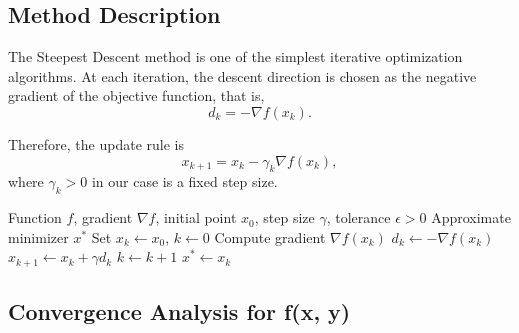 \documentclass[11pt]{article}
\begin{document}
\subsection{Method Description}

The Steepest Descent method is one of the simplest iterative optimization algorithms.
At each iteration, the descent direction is chosen as the negative gradient of the
objective function, that is,
\[
d_k = -\nabla f(x_k).
\]

Therefore, the update rule is
\[
x_{k+1} = x_k - \gamma_k \nabla f(x_k),
\]
where $\gamma_k > 0$ in our case is a fixed step size.

\begin{algorithm}[H]
\caption{Steepest Descent Method}
\begin{algorithmic}[1]
\Require Function $f$, gradient $\nabla f$, initial point $x_0$, step size $\gamma$, tolerance $\epsilon > 0$
\Ensure Approximate minimizer $x^*$
\State Set $x_k \gets x_0$, $k \gets 0$
    \State Compute gradient $\nabla f(x_k)$
    \State $d_k \gets -\nabla f(x_k)$ 
    \State $x_{k+1} \gets x_k + \gamma d_k$
    \State $k \gets k + 1$
\EndWhile
\State \Return $x^* \gets x_k$
\end{algorithmic}
\end{algorithm}

\subsection{Convergence Analysis for f(x, y)}
\end{document}
